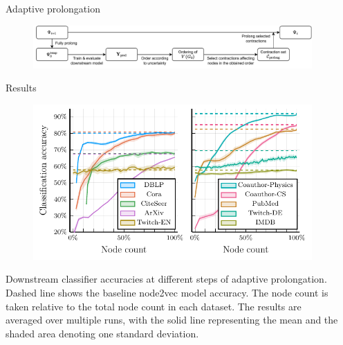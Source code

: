 \documentclass{beamer}
\newlength{\sepwidth}
\newlength{\colwidth}
\newcommand{\separatorcolumn}{\begin{column}{\sepwidth}\end{column}}
\begin{document}
\begin{frame}[t]
\begin{columns}[t]
\begin{column}{\colwidth}
		\begin{block}{Adaptive prolongation}
			\begin{figure}
				\includegraphics[width=\linewidth]{images/adaptive-prolongation/adaptive-prolongation.pdf}
			\end{figure}
		\end{block}

		\begin{block}{Results}
			\begin{figure}
				\includegraphics[width = \linewidth]{images/adaptive-coarsening/adaptive-coarsening.pdf}
			\end{figure}
			Downstream classifier accuracies at different steps of adaptive prolongation. Dashed line shows the baseline node2vec model accuracy. The node count is taken relative to the total node count in each dataset. The results are averaged over multiple runs, with the solid line representing the mean and the shaded area denoting one standard deviation.
		\end{block}
	\end{column}

	\separatorcolumn
\end{columns}

\end{frame}
\end{document}
